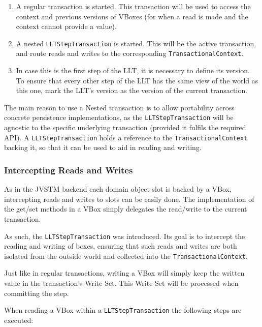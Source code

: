 \documentclass{llncs}
\begin{document}
\begin{enumerate}

\item A regular transaction is started. This transaction will be used
  to access the context and previous versions of VBoxes (for when a
  read is made and the context cannot provide a value).

\item A nested \texttt{LLTStepTransaction} is started. This will be the
  active transaction, and route reads and writes to the corresponding
  \texttt{TransactionalContext}.

\item In case this is the first step of the LLT, it is necessary to
  define its version. To ensure that every other step of the LLT has
  the same view of the world as this one, mark the LLT's version as
  the version of the current transaction.

\end{enumerate}

The main reason to use a Nested transaction is to allow portability
across concrete persistence implementations, as the
\texttt{LLTStepTransaction} will be agnostic to the specific
underlying transaction (provided it fulfils the required API). A
\texttt{LLTStepTransaction} holds a reference to the
\texttt{TransactionalContext} backing it, so that it can be used to
aid in reading and writing.

\subsubsection{Intercepting Reads and Writes}

As in the JVSTM backend each domain object slot is backed by a VBox,
intercepting reads and writes to slots can be easily done. The
implementation of the get/set methods in a VBox simply delegates the
read/write to the current transaction.

As such, the \texttt{LLTStepTransaction} was introduced. Its goal is
to intercept the reading and writing of boxes, ensuring that such
reads and writes are both isolated from the outside world and
collected into the \texttt{TransactionalContext}.

Just like in regular transactions, writing a VBox will simply keep the
written value in the transaction's Write Set. This Write Set will be
processed when committing the step.

When reading a VBox within a \texttt{LLTStepTransaction} the following
steps are executed:
\end{document}
